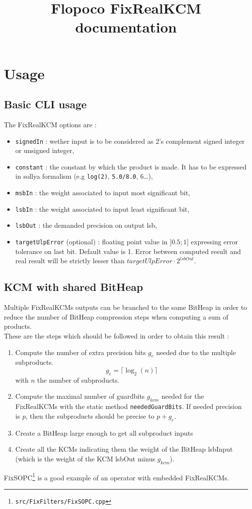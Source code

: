 \documentclass[10pt, a4paper, twocolumn]{article}
\title{Flopoco FixRealKCM documentation}
\begin{document}
\maketitle
\section{Usage}
\subsection{Basic CLI usage}
The FixRealKCM options are :
\begin{itemize}
\item \texttt{signedIn} : wether input is to be considered as 2's complement signed integer or unsigned integer,
\item \texttt{constant}  : the constant by which the product is made. It has to be expressed in sollya formalism  (e.g \texttt{log(2)}, \texttt{5.0/8.0}, 6\dots),
\item \texttt{msbIn} : the weight associated to input most significant bit,
\item \texttt{lsbIn} : the weight associated to input least significant bit,
\item \texttt{lsbOut} : the demanded precision on output lsb,
\item \texttt{targetUlpError} (optional) : floating point value in $]0.5 ; 1]$ expressing error tolerance on last bit. Default value is 1. Error between computed result and real result will be strictly lesser than $targetUlpError \cdot 2^{lsbOut}$.
\end{itemize}
\subsection{KCM with shared BitHeap}
Multiple FixRealKCMs outputs can be branched to the same BitHeap in order to reduce the number of BitHeap compression steps when computing a sum of products.\\

These are the steps which should be followed in order to obtain this result :
\begin{enumerate}
\item Compute the number of extra precision bits $g_e$ needed due to the multiple subproducts.
\[ g_e =  \lceil\log_2(n)\rceil\]
with $n$ the number of subproducts.
\item Compute the maximal number of guardbits $g_{kcm}$ needed for the FixRealKCMs with the static method \texttt{neededGuardBits}. If needed precision is $p$, then the subproducts should be precise to $p + g_e$.

\item Create a BitHeap large enough to get all subproduct inputs

\item Create all the KCMs indicating them the weight of the BitHeap lsbInput (which is the weight of the KCM lsbOut minus $g_{kcm}$).
\end{enumerate}
FixSOPC\footnote{\texttt{src/FixFilters/FixSOPC.cpp}} is a good example of an operator with embedded FixRealKCMs.
\end{document}
